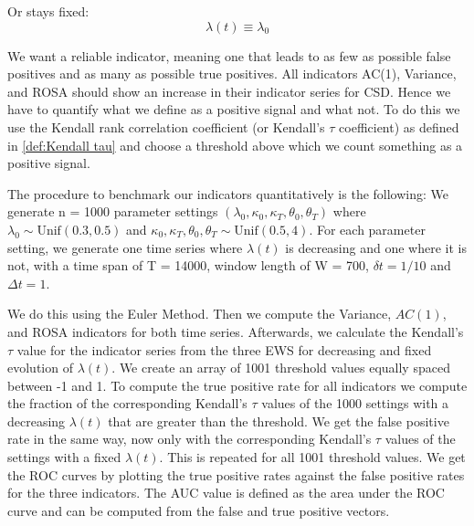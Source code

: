 \documentclass[%
thesis=student,%
coverpage=false,%
titlepage=false,%
headmarks=true, %
english,%
font=libertine, %
math=newpxtx, %
BCOR=5mm,%
coverBCOR=11mm%
]{tumbook}
\begin{document}
Or stays fixed: 
    \[
    \lambda(t)\equiv\lambda_{0}
    \]

We want a reliable indicator, meaning one that leads to as few as possible false positives and as many as possible true positives. All indicators AC(1), Variance, and ROSA should show an increase in their indicator series for CSD. Hence we have to quantify what we define as a positive signal and what not. To do this we use the Kendall rank correlation coefficient (or Kendall's $\tau$ coefficient) as defined in \ref{def:Kendall tau} and choose a threshold above which we count something as a positive signal. 



The procedure to benchmark our indicators quantitatively is the following:
We generate n = 1000 parameter settings $(\lambda_{0},\kappa_{0},\kappa_{T},\theta_{0},\theta_{T})$ where $\lambda_{0} \sim \text{Unif}(0.3,0.5)$ and $\kappa_{0},\kappa_{T},\theta_{0},\theta_{T} \sim \text{Unif}(0.5,4)$. For each parameter setting, we generate one time series where $\lambda(t)$ is decreasing and one where it is not, with a time span of T = 14000, window length of W = 700, $\delta t = 1/10$ and $\Delta t = 1$.


 We do this using the Euler Method. Then we compute the Variance, $AC(1)$, and ROSA indicators for both time series. Afterwards, we calculate the Kendall's $\tau$ value for the indicator series from the three EWS for decreasing and fixed evolution of $\lambda(t)$. We create an array of 1001 threshold values equally spaced between -1 and 1. To compute the true positive rate for all indicators we compute the fraction of the corresponding Kendall's $\tau$ values of the 1000 settings with a decreasing $\lambda(t)$ that are greater than the threshold. We get the false positive rate in the same way, now only with the corresponding Kendall's $\tau$ values of the settings with a fixed $\lambda(t)$. This is repeated for all 1001 threshold values. We get the ROC curves by plotting the true positive rates against the false positive rates for the three indicators.
The AUC value is defined as the area under the ROC curve and can be computed from the false and true positive vectors. 
\end{document}

